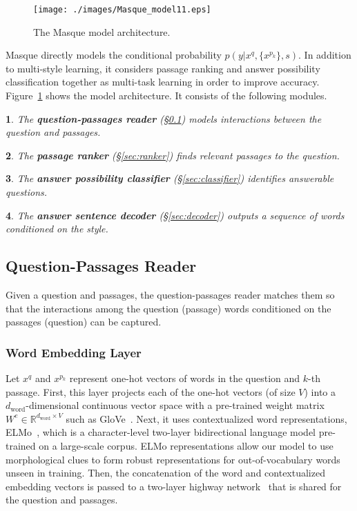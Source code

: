 \documentclass[11pt,a4paper]{article}
\theoremstyle{mydef}
\theoremstyle{myprob}
\newtheorem{layer1}{}
\begin{document}
\begin{figure}[t!]
\centering
\texttt{[image: ./images/Masque\_model11.eps]}
\caption{The Masque model architecture.}
\label{fig:model}
\end{figure}

Masque directly models 
the conditional probability $p(y|x^q, \{x^{p_k}\}, s)$.
In addition to multi-style learning, it considers passage ranking and answer possibility classification together as multi-task learning in order to improve accuracy. 
Figure~\ref{fig:model} shows the model architecture. It consists of the following modules.
\begin{layer1}
The \textbf{question-passages reader} (\S\ref{sec:reader}) models interactions between the question and passages.
\end{layer1}
\begin{layer1}
The \textbf{passage ranker} (\S\ref{sec:ranker}) finds relevant passages to the question.
\end{layer1}
\begin{layer1}
The \textbf{answer possibility classifier} (\S\ref{sec:classifier}) identifies answerable questions.
\end{layer1}
\begin{layer1}
The \textbf{answer sentence decoder} (\S\ref{sec:decoder}) outputs a sequence of words conditioned on the style.
\end{layer1}


\subsection{Question-Passages Reader}
\label{sec:reader}

Given a question and  passages, the question-passages reader matches them so that the interactions among the question (passage) words conditioned on the passages (question) can be captured.

\subsubsection{Word Embedding Layer}

Let $x^q$ and $x^{p_k}$ represent 
one-hot vectors of 
words in the question and  $k$-th passage. First, this layer projects each of the one-hot vectors (of size $V$) into a $d_\mathrm{word}$-dimensional continuous vector space with a pre-trained weight matrix $W^e \in \mathbb{R}^{d_\mathrm{word} \times V}$ such as GloVe~\citep{PenningtonSM14}. Next, it uses contextualized word representations, ELMo~\citep{PetersNIGCLZ18}, which is a character-level two-layer bidirectional language model pre-trained on a large-scale corpus. ELMo representations allow our model to use morphological clues to form robust representations for out-of-vocabulary words unseen in training. Then, the concatenation of the word and contextualized embedding vectors is passed to a two-layer highway network~\citep{SrivastavaGS15} that is shared for the question and passages. 
\end{document}
